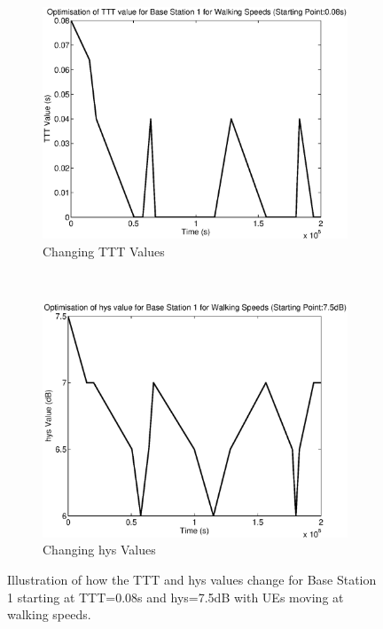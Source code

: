 \begin{figure}[H]
        \centering
        \begin{subfigure}[b]{0.49\textwidth}
                \includegraphics[width=\textwidth]{figures/graphs/walkhighhys/TTT1.eps}
                \caption{Changing TTT Values}
        \end{subfigure}%
        ~ %
        \begin{subfigure}[b]{0.49\textwidth}
                \includegraphics[width=\textwidth]{figures/graphs/walkhighhys/hys1.eps}
                \caption{Changing hys Values}
        \end{subfigure}
        \caption{Illustration of how the TTT and hys values change for Base Station 1 starting at TTT=0.08s and hys=7.5dB with UEs moving at walking speeds.}
\end{figure}
